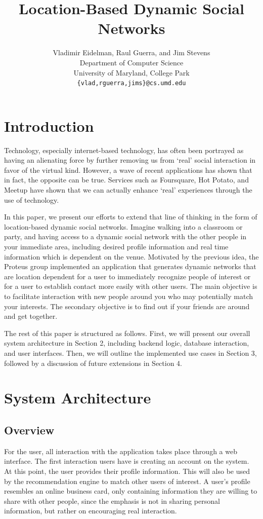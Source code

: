 \documentclass[11pt]{article}
\title{Location-Based Dynamic Social Networks}
\author{
   Vladimir Eidelman, Raul Guerra, and Jim Stevens\\
Department of Computer Science \\
University of Maryland, College Park\\
 { \tt \{vlad,rguerra,jims\}@cs.umd.edu}
}
\begin{document}
\maketitle 

\section{Introduction}


Technology, especially internet-based technology, has often been portrayed as having an alienating force by further removing us from `real' social interaction in favor of the virtual kind. However, a wave of recent applications has shown that in fact, the opposite can be true. Services such as Foursquare, Hot Potato, and Meetup have shown that we can actually enhance `real' experiences through the use of technology. 

In this paper, we present our efforts to extend that line of thinking in the form of location-based dynamic social networks. Imagine walking into a classroom or party, and having access to a dynamic social network with the other people in your immediate area, including desired profile information and real time information which is dependent on the venue. Motivated by the previous idea, the Proteus group implemented an application that generates dynamic networks that are location dependent for a user to immediately recognize people of interest or for a user to establish contact more easily with other users. The main objective is to facilitate interaction with new people around you who may potentially match your interests. The secondary objective is to find out if your friends are around and get together. 

The rest of this paper is structured as follows. First, we will present our overall system architecture in Section 2, including backend logic, database interaction, and user interfaces. Then, we will outline the implemented use cases in Section 3, followed by a discussion of future extensions in Section 4.


\section{System Architecture}

\subsection{Overview}

For the user, all interaction with the application takes place through a web interface. The first interaction users have is creating an account on the system. At this point, the user provides their profile information. This will also be used by the recommendation engine to match other users of interest. A user's profile resembles an online business card, only containing information they are willing to share with other people, since the emphasis is not in sharing personal information, but rather on encouraging real interaction. 
\end{document}
